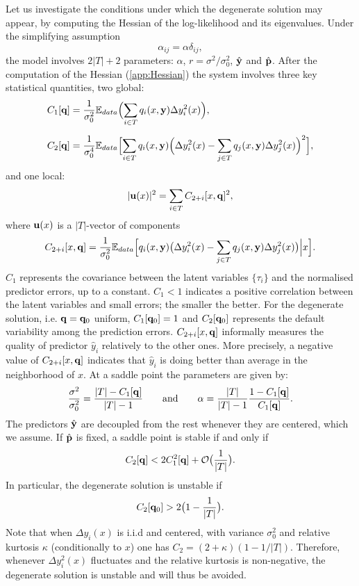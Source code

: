 Let us investigate the conditions under which the degenerate solution may appear, by computing the 
Hessian of the log-likelihood and its eigenvalues. Under the simplifying assumption
\[
  \alpha_{ij} = \alpha \delta_{ij},
\]
the model involves $2\vert T\vert+2$ parameters: $\alpha$, $r = \sigma^2/\sigma_0^2$, 
$\hat {\bf y}$ and $\hat{\bf p}$. After the computation of the Hessian (\cref{app:Hessian}) the system 
involves three key statistical quantities, two global:
%
\begin{align}
  C_1[{\bf q}] &= \frac{1}{\sigma_0^2}{
    \mathbb E}_{data}
      \Bigl(
        \sum_{i \in T} q_i(x,{\bf y})\Delta y_i^2(x)
      \Bigr), \label{def:C1}\\[0.2cm]
  C_2[{\bf q}] &= \frac{1}{\sigma_0^4} {\mathbb E}_{data} 
    \Bigl[\sum_{i\in T}q_i(x,{\bf y})
      \Bigl(
        \Delta y_i^2(x)-\sum_{j \in T} q_j(x,{\bf y})\Delta y_j^2(x)
      \Bigr)^2
    \Bigr],\label{def:C2}
\end{align}
%
and one local:
\begin{equation}
  \vert {\bf u}(x)\vert^2 = \sum_{i\in T} C_{2+i}[x,{\bf q}]^2,
\end{equation}
%
where ${\bf u}(x)$ is a $\vert T\vert$-vector of components 
%
\[
  C_{2+i}[x,{\bf q}] = \frac{1}{\sigma_0^2}{\mathbb E}_{data}
    \Bigl[ q_i(x,{\bf y})
      \bigl(
        \Delta y_i^2(x)-\sum_{j \in T} q_j(x,{\bf y})\Delta y_j^2(x)
      \bigr)\Big\vert x 
    \Bigr].
\]
%
$C_1$ represents the covariance between the latent variables $\{\tau_i\}$ and the normalised 
predictor errors, up to a constant. $C_1 < 1$ indicates a positive correlation between the latent 
variables and small errors; the smaller the better. For the degenerate solution, i.e. 
${\bf q}={\bf q}_{0}$ uniform, $C_1[{\bf q}_{0}]=1$ and $C_2[{\bf q}_{0}]$ represents the default variability among the 
prediction errors. $C_{2+i}[x,{\bf q}]$ informally measures the quality of predictor $\hat y_i$ 
relatively to the other ones. More precisely, a negative value of  $C_{2+i}[x,{\bf q}]$ indicates 
that $\hat y_i$ is doing better than average in the neighborhood of $x$.  
%
At a saddle point the parameters are given by:
%
\[
  \frac{\sigma^2}{\sigma_0^2} = 
    \frac{\vert T\vert-C_1[{\bf q}]}{\vert T\vert-1} 
    \qquad\text{and}\qquad
    \alpha = \frac{\vert T\vert}{\vert T\vert-1}\frac{1-C_1[{\bf q}]}{C_1[{\bf q}]}.
\]
%
The predictors $\hat {\bf y}$ are decoupled from the rest whenever they are centered, which we 
assume. If $\hat {\bf p}$ is fixed, a saddle point is stable if and only if
%
\[
  C_2[{\bf q}] < 2C_1^2[{\bf q}]+{\cal O}\bigl(\frac{1}{\vert T\vert}\bigr).
\]
%
In particular, the degenerate solution is unstable if
%
\[
  C_2[{\bf q}_0] > 2\bigl(1-\frac{1}{\vert T\vert}\bigr).
\]
%
Note that when $\Delta y_i(x)$ is i.i.d and centered, with variance $\sigma_0^2$ and relative 
kurtosis $\kappa$ (conditionally to $x$) one has $C_2 = (2+\kappa)(1-1/\vert T\vert)$. Therefore, 
whenever $\Delta y_i^2(x)$ fluctuates and the relative kurtosis is non-negative,
the degenerate solution is unstable and will thus be avoided.

